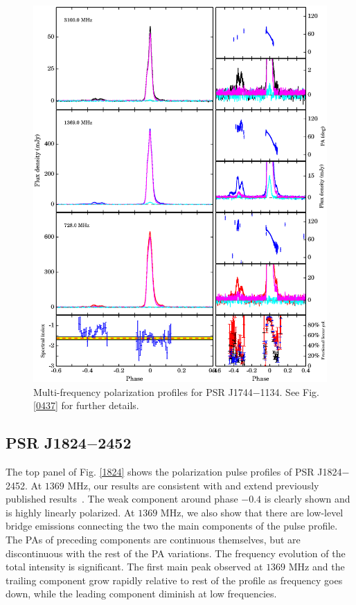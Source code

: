 \documentclass[useAMS,usenatbib]{mn2e}
\begin{document}
\begin{figure}
\begin{center}
\includegraphics[width=6 in]{1744.ps}
\caption{Multi-frequency polarization profiles for PSR J1744$-$1134. 
See Fig. \ref{0437} for further details.}
\label{1744}
\end{center}
\end{figure}



\subsection{PSR J1824$-$2452}

The top panel of Fig. \ref{1824} shows the polarization pulse profiles of 
PSR J1824$-$2452.
%
At $1369$ MHz, our results are consistent with and extend previously published 
results~\citep{Yan11}.
%
The weak component around phase $-0.4$ is clearly shown and is highly 
linearly polarized. 
%
At $1369$ MHz, we also show that there are low-level bridge emissions 
connecting the two the main components of the pulse profile.
%
The PAs of preceding components are continuous themselves, but are 
discontinuous with the rest of the PA variations.
%
The frequency evolution of the total intensity is significant. The first 
main peak observed at $1369$ MHz and the trailing component grow rapidly 
relative to rest of the profile as frequency goes down, while the leading 
component diminish at low frequencies.
\end{document}
